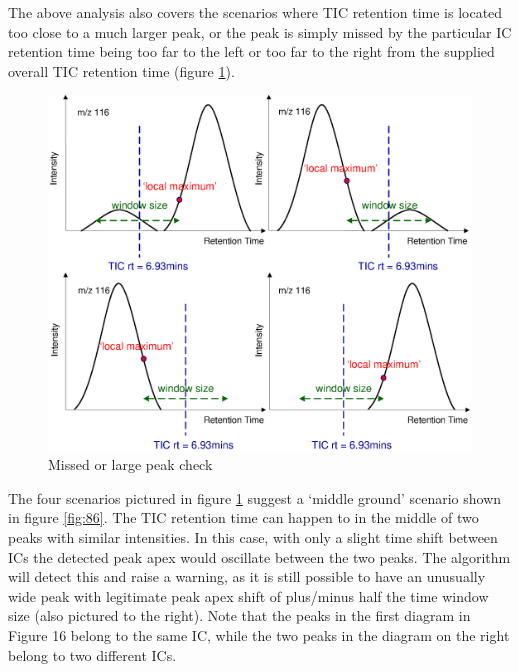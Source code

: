 The above analysis also covers the scenarios where TIC retention time is
located too close to a much larger peak, or the peak is simply missed by
the particular IC retention time being too far to the left or too far to
the right from the supplied overall TIC retention time (figure \ref{fig:85}).

\begin{figure}
  \begin{center}
    \includegraphics[scale=0.7]{graphics/chapter08/85.eps}
  \end{center}
  \caption{Missed or large peak check}
  \label{fig:85}
\end{figure}

The four scenarios pictured in figure \ref{fig:85} suggest a ‘middle 
ground’ scenario shown in figure \ref{fig:86}. The TIC retention time
can happen to in the middle of two peaks with similar intensities.
In this case, with only a slight time shift between ICs the detected
peak apex would oscillate between the two peaks. The algorithm will
detect this and raise a warning, as it is still possible to have an
unusually wide peak with legitimate peak apex shift of plus/minus
half the time window size (also pictured to the right). Note that
the peaks in the first diagram in Figure 16 belong to the same IC,
while the two peaks in the diagram on the right belong to two
different ICs.

